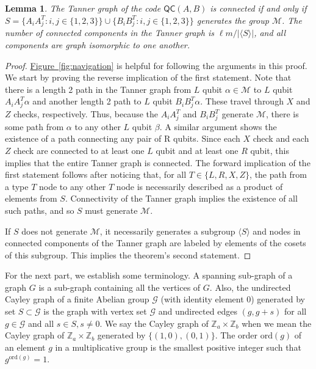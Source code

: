 \documentclass{article}
\newcommand{\ord}[1]{\mathrm{ord}(#1)}
\newcommand{\qc}{\mathsf{QC}(A,B)}
\newtheorem{lemma}{Lemma}
\newcommand{\fig}[1]{\hyperref[fig:#1]{Figure~\ref*{fig:#1}}}
\begin{document}
\begin{lemma} \label{lem:connected}
The Tanner graph of the code $\qc$ is connected if and only if $S=\{A_iA_j^T:i,j\in\{1,2,3\}\}\cup\{B_iB_j^T:i,j\in\{1,2,3\}\}$ generates the group $\mathcal{M}$. The number of connected components in the Tanner graph is $\ell m/|\langle S\rangle|$, and all components are graph isomorphic to one another.
\end{lemma}
\begin{proof}
\fig{navigation} is helpful for following the arguments in this proof. We start by proving the reverse implication of the first statement. Note that there is a length 2 path in the Tanner graph from $L$ qubit $\alpha\in \mathcal{M}$ to $L$ qubit $A_iA_j^T\alpha$ and another length 2 path to $L$ qubit $B_iB_j^T\alpha$. These travel through $X$ and $Z$ checks, respectively. Thus, because the $A_iA_j^T$ and $B_iB_j^T$ generate $\mathcal{M}$, there is some path from $\alpha$ to any other $L$ qubit $\beta$. 
A similar argument shows the existence of a path connecting any pair of R qubits. Since each $X$ check and each $Z$ check are connected to at least one $L$ qubit and at least one $R$ qubit, this implies that the entire Tanner graph is connected.
The forward implication of the first statement follows after noticing that, for all $T\in\{L,R,X,Z\}$, the path from a type $T$ node to any other $T$ node is necessarily described as a product of elements from $S$. Connectivity of the Tanner graph implies the existence of all such paths, and so $S$ must generate $\mathcal{M}$. 

If $S$ does not generate $\mathcal{M}$, it necessarily generates a subgroup $\langle S\rangle$ and nodes in connected components of the Tanner graph are labeled by elements of the cosets of this subgroup. This implies the theorem's second statement.
\end{proof}

For the next part, we establish some terminology. A spanning sub-graph of a graph $G$ is a sub-graph containing all the vertices of $G$. Also, the undirected Cayley graph of a finite Abelian group $\mathcal{G}$ (with identity element $0$) generated by set $S\subset\mathcal{G}$ is the graph with vertex set $\mathcal{G}$ and undirected edges $(g,g+s)$ for all $g\in\mathcal{G}$ and all $s\in S,s\neq0$. We say the Cayley graph of $\mathbb{Z}_{a}\times\mathbb{Z}_{b}$ when we mean the Cayley graph of $\mathbb{Z}_{a}\times\mathbb{Z}_{b}$ generated by $\{(1,0),(0,1)\}$. The order $\ord{g}$ of an element $g$ in a multiplicative group is the smallest positive integer such that $g^{\ord{g}}=1$. 
\end{document}
